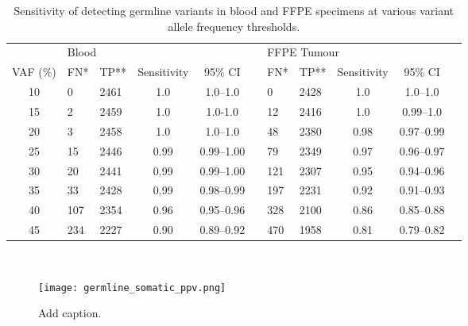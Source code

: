 \begin{table}[H]
\caption{Sensitivity of detecting germline variants in blood and FFPE specimens at various variant allele frequency thresholds.}
\label{sensitivity}
\centering
      \begin{tabular}{cllcclllccl}
        \hline
				\multicolumn{1}{l}{ }
				&
				\multicolumn{4}{l}{Blood}
				&&
				\multicolumn{4}{l}{FFPE Tumour}
        \\
				\cline{2-5}\cline{7-10}
        VAF (\%) & FN\mbox{*} & TP\mbox{**} & Sensitivity & 95\% CI && FN\mbox{*} & TP\mbox{**} & Sensitivity & 95\% CI
        \\
        \hline
        10 & 0 & 2461 & 1.0 & 1.0--1.0 && 0 & 2428 & 1.0 & 1.0--1.0
        \\
        15 & 2 & 2459 & 1.0 & 1.0-1.0 && 12 & 2416 & 1.0 & 0.99--1.0
        \\
        20 & 3 & 2458 & 1.0 & 1.0--1.0 && 48 & 2380 & 0.98 & 0.97--0.99
        \\
        25 & 15 & 2446 & 0.99 & 0.99--1.00 && 79 & 2349 & 0.97 & 0.96--0.97
        \\
        30 & 20 & 2441 & 0.99 & 0.99--1.00 && 121 & 2307 & 0.95 & 0.94--0.96
        \\
        35 & 33 & 2428 & 0.99 & 0.98--0.99 && 197 & 2231 & 0.92 & 0.91--0.93
        \\
        40 & 107 & 2354 & 0.96 & 0.95--0.96 && 328 & 2100 & 0.86 & 0.85--0.88
        \\
        45 & 234 & 2227 & 0.90 & 0.89--0.92 && 470 & 1958 & 0.81 & 0.79--0.82
        \\
				\hline
      \end{tabular} \\
\end{table}

\begin{figure}[H]
	\texttt{[image: germline\_somatic\_ppv.png]}
	\caption{Add caption.}
	\label{fig:germline_somatic_ppv}
\end{figure}


